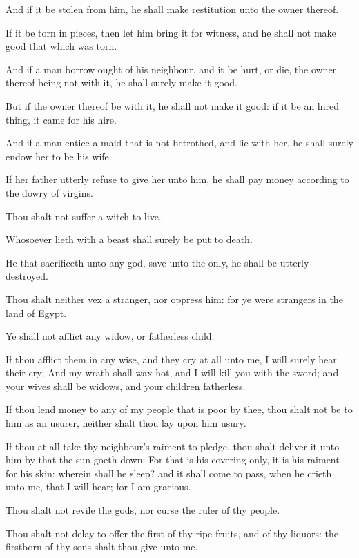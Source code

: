 \verse And if it be stolen from him, he shall make restitution unto the owner thereof.

\verse If it be torn in pieces, then let him bring it for witness, and he shall not make good that which was torn.

\verse And if a man borrow ought of his neighbour, and it be hurt, or die, the owner thereof being not with it, he shall surely make it good.

\verse But if the owner thereof be with it, he shall not make it good: if it be an hired thing, it came for his hire.

\verse And if a man entice a maid that is not betrothed, and lie with her, he shall surely endow her to be his wife.

\verse If her father utterly refuse to give her unto him, he shall pay money according to the dowry of virgins.

\verse Thou shalt not suffer a witch to live.

\verse Whosoever lieth with a beast shall surely be put to death.

\verse He that sacrificeth unto any god, save unto the \LORD only, he shall be utterly destroyed.

\verse Thou shalt neither vex a stranger, nor oppress him: for ye were strangers in the land of Egypt.

\verse Ye shall not afflict any widow, or fatherless child.

\verse If thou afflict them in any wise, and they cry at all unto me, I will surely hear their cry; \verse And my wrath shall wax hot, and I will kill you with the sword; and your wives shall be widows, and your children fatherless.

\verse If thou lend money to any of my people that is poor by thee, thou shalt not be to him as an usurer, neither shalt thou lay upon him usury.

\verse If thou at all take thy neighbour's raiment to pledge, thou shalt deliver it unto him by that the sun goeth down: \verse For that is his covering only, it is his raiment for his skin: wherein shall he sleep? and it shall come to pass, when he crieth unto me, that I will hear; for I am gracious.

\verse Thou shalt not revile the gods, nor curse the ruler of thy people.

\verse Thou shalt not delay to offer the first of thy ripe fruits, and of thy liquors: the firstborn of thy sons shalt thou give unto me.

